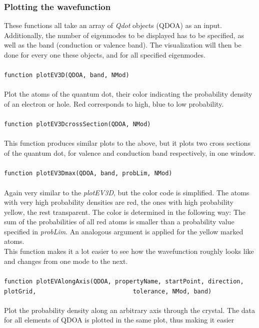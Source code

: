 			\subsubsection{Plotting the wavefunction}
				These functions all take an array of \textit{Qdot} objects (QDOA) as an input. Additionally, the number of eigenmodes to be displayed has to be specified, 
				as well as the band (conduction or valence band). The visualization will then be done for every one these objects, and for all specified eigenmodes.\\ \\
				\lstinline{function plotEV3D(QDOA, band, NMod) }\\\\
				Plot the atoms of the quantum dot, their color indicating the probability density of an electron or hole. Red corresponds to high, blue to low probability.\\ \\
				\lstinline{function plotEV3DcrossSection(QDOA, NMod) }\\\\
				This function produces similar plots to the above, but it plots two cross sections of the quantum dot, for valence and conduction band respectively, 
				in one window.\\\\
				\lstinline{function plotEV3Dmax(QDOA, band, probLim, NMod)}\\\\
				Again very similar to the \textit{plotEV3D}, but the color code is simplified. The atoms with very high probability densities are red, the ones with high 
				probability yellow, the rest transparent. The color is determined in the following way: The sum of the probabilities of all red atoms is smaller than a 
				probability value specified in \textit{probLim}. An analogous argument is applied for the yellow marked atoms.\\
				This function makes it a lot easier to see how the wavefunction roughly looks like and changes from one mode to the next.\\\\
				\lstinline{function plotEVAlongAxis(QDOA, propertyName, startPoint, direction, plotGrid,                           tolerance, NMod, band)}\\\\
				Plot the probability density along an arbitrary axis through the crystal. The data for all elements of QDOA is plotted in the same plot, thus making it easier
